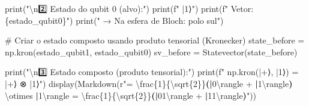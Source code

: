\documentclass[
  brazilian,
]{report}
\newenvironment{Shaded}{\begin{snugshade}}{\end{snugshade}}
\newcommand{\BuiltInTok}[1]{\textcolor[rgb]{0.00,0.23,0.31}{#1}}
\newcommand{\CharTok}[1]{\textcolor[rgb]{0.13,0.47,0.30}{#1}}
\newcommand{\CommentTok}[1]{\textcolor[rgb]{0.37,0.37,0.37}{#1}}
\newcommand{\ControlFlowTok}[1]{\textcolor[rgb]{0.00,0.23,0.31}{\textbf{#1}}}
\newcommand{\DecValTok}[1]{\textcolor[rgb]{0.68,0.00,0.00}{#1}}
\newcommand{\ErrorTok}[1]{\textcolor[rgb]{0.68,0.00,0.00}{#1}}
\newcommand{\KeywordTok}[1]{\textcolor[rgb]{0.00,0.23,0.31}{\textbf{#1}}}
\newcommand{\NormalTok}[1]{\textcolor[rgb]{0.00,0.23,0.31}{#1}}
\newcommand{\OperatorTok}[1]{\textcolor[rgb]{0.37,0.37,0.37}{#1}}
\newcommand{\SpecialCharTok}[1]{\textcolor[rgb]{0.37,0.37,0.37}{#1}}
\newcommand{\SpecialStringTok}[1]{\textcolor[rgb]{0.13,0.47,0.30}{#1}}
\newcommand{\StringTok}[1]{\textcolor[rgb]{0.13,0.47,0.30}{#1}}
\newcommand{\VerbatimStringTok}[1]{\textcolor[rgb]{0.13,0.47,0.30}{#1}}
\begin{document}
\begin{tcolorbox}
\begin{Shaded}
\begin{Highlighting}[]
\BuiltInTok{print}\NormalTok{(}\StringTok{"}\CharTok{\textbackslash{}n}\StringTok{2️⃣ Estado do qubit 0 (alvo):"}\NormalTok{)}
\BuiltInTok{print}\NormalTok{(}\SpecialStringTok{f"   |1⟩"}\NormalTok{)}
\BuiltInTok{print}\NormalTok{(}\SpecialStringTok{f"   Vetor: }\SpecialCharTok{\{}\NormalTok{estado\_qubit0}\SpecialCharTok{\}}\SpecialStringTok{"}\NormalTok{)}
\BuiltInTok{print}\NormalTok{(}\StringTok{"   → Na esfera de Bloch: polo sul"}\NormalTok{)}

\CommentTok{\# Criar o estado composto usando produto tensorial (Kronecker)}
\NormalTok{state\_before }\OperatorTok{=}\NormalTok{ np.kron(estado\_qubit1, estado\_qubit0)}
\NormalTok{sv\_before }\OperatorTok{=}\NormalTok{ Statevector(state\_before)}

\BuiltInTok{print}\NormalTok{(}\StringTok{"}\CharTok{\textbackslash{}n}\StringTok{3️⃣ Estado composto (produto tensorial):"}\NormalTok{)}
\BuiltInTok{print}\NormalTok{(}\SpecialStringTok{f"   np.kron(|+⟩, |1⟩) = |+⟩ ⊗ |1⟩"}\NormalTok{)}
\NormalTok{display(Markdown(}\VerbatimStringTok{r"}\DecValTok{$$}\VerbatimStringTok{= }\CharTok{\textbackslash{}f}\VerbatimStringTok{rac}\OperatorTok{\{1\}}\VerbatimStringTok{\{}\DecValTok{\textbackslash{}s}\VerbatimStringTok{qrt}\OperatorTok{\{2\}}\VerbatimStringTok{\}}\KeywordTok{(}\ControlFlowTok{|}\VerbatimStringTok{0}\CharTok{\textbackslash{}r}\VerbatimStringTok{angle }\OperatorTok{+}\VerbatimStringTok{ }\ControlFlowTok{|}\VerbatimStringTok{1}\CharTok{\textbackslash{}r}\VerbatimStringTok{angle}\KeywordTok{)}\VerbatimStringTok{ }\ErrorTok{\textbackslash{}}\VerbatimStringTok{otimes }\ControlFlowTok{|}\VerbatimStringTok{1}\CharTok{\textbackslash{}r}\VerbatimStringTok{angle = }\CharTok{\textbackslash{}f}\VerbatimStringTok{rac}\OperatorTok{\{1\}}\VerbatimStringTok{\{}\DecValTok{\textbackslash{}s}\VerbatimStringTok{qrt}\OperatorTok{\{2\}}\VerbatimStringTok{\}}\KeywordTok{(}\ControlFlowTok{|}\VerbatimStringTok{01}\CharTok{\textbackslash{}r}\VerbatimStringTok{angle }\OperatorTok{+}\VerbatimStringTok{ }\ControlFlowTok{|}\VerbatimStringTok{11}\CharTok{\textbackslash{}r}\VerbatimStringTok{angle}\KeywordTok{)}\DecValTok{$$}\VerbatimStringTok{"}\NormalTok{))}


\end{Highlighting}
\end{Shaded}
\end{tcolorbox}
\end{document}
